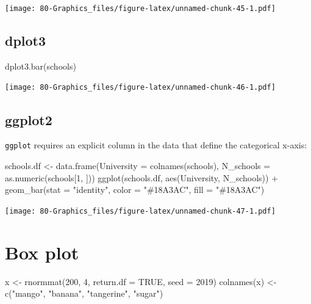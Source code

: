 \documentclass[
]{book}
\newenvironment{Shaded}{\begin{snugshade}}{\end{snugshade}}
\newcommand{\AttributeTok}[1]{\textcolor[rgb]{0.77,0.63,0.00}{#1}}
\newcommand{\ConstantTok}[1]{\textcolor[rgb]{0.00,0.00,0.00}{#1}}
\newcommand{\DecValTok}[1]{\textcolor[rgb]{0.00,0.00,0.81}{#1}}
\newcommand{\FunctionTok}[1]{\textcolor[rgb]{0.00,0.00,0.00}{#1}}
\newcommand{\NormalTok}[1]{#1}
\newcommand{\OtherTok}[1]{\textcolor[rgb]{0.56,0.35,0.01}{#1}}
\newcommand{\SpecialCharTok}[1]{\textcolor[rgb]{0.00,0.00,0.00}{#1}}
\newcommand{\StringTok}[1]{\textcolor[rgb]{0.31,0.60,0.02}{#1}}
\begin{document}
\texttt{[image: 80-Graphics\_files/figure-latex/unnamed-chunk-45-1.pdf]}

\hypertarget{dplot3-4}{%
\subsection{\texorpdfstring{\textbf{dplot3}}{dplot3}}\label{dplot3-4}}

\begin{Shaded}
\begin{Highlighting}[]
\FunctionTok{dplot3.bar}\NormalTok{(schools)}
\end{Highlighting}
\end{Shaded}

\texttt{[image: 80-Graphics\_files/figure-latex/unnamed-chunk-46-1.pdf]}

\hypertarget{ggplot2-5}{%
\subsection{\texorpdfstring{\textbf{ggplot2}}{ggplot2}}\label{ggplot2-5}}

\texttt{ggplot} requires an explicit column in the data that define the categorical x-axis:

\begin{Shaded}
\begin{Highlighting}[]
\NormalTok{schools.df }\OtherTok{\textless{}{-}} \FunctionTok{data.frame}\NormalTok{(}\AttributeTok{University =} \FunctionTok{colnames}\NormalTok{(schools),}
                         \AttributeTok{N\_schools =} \FunctionTok{as.numeric}\NormalTok{(schools[}\DecValTok{1}\NormalTok{, ]))}
\FunctionTok{ggplot}\NormalTok{(schools.df, }\FunctionTok{aes}\NormalTok{(University, N\_schools)) }\SpecialCharTok{+}
  \FunctionTok{geom\_bar}\NormalTok{(}\AttributeTok{stat =} \StringTok{"identity"}\NormalTok{, }\AttributeTok{color =} \StringTok{"\#18A3AC"}\NormalTok{, }\AttributeTok{fill =} \StringTok{"\#18A3AC"}\NormalTok{)}
\end{Highlighting}
\end{Shaded}

\texttt{[image: 80-Graphics\_files/figure-latex/unnamed-chunk-47-1.pdf]}

\hypertarget{box-plot}{%
\section{Box plot}\label{box-plot}}

\begin{Shaded}
\begin{Highlighting}[]
\NormalTok{x }\OtherTok{\textless{}{-}} \FunctionTok{rnormmat}\NormalTok{(}\DecValTok{200}\NormalTok{, }\DecValTok{4}\NormalTok{, }\AttributeTok{return.df =} \ConstantTok{TRUE}\NormalTok{, }\AttributeTok{seed =} \DecValTok{2019}\NormalTok{)}
\FunctionTok{colnames}\NormalTok{(x) }\OtherTok{\textless{}{-}} \FunctionTok{c}\NormalTok{(}\StringTok{"mango"}\NormalTok{, }\StringTok{"banana"}\NormalTok{, }\StringTok{"tangerine"}\NormalTok{, }\StringTok{"sugar"}\NormalTok{)}
\end{Highlighting}
\end{Shaded}
\end{document}
